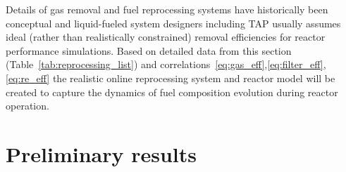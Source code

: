Details of gas removal and fuel reprocessing systems have historically been conceptual 
and liquid-fueled system designers including \gls{TAP} usually assumes ideal (rather 
than realistically constrained) removal efficiencies for reactor performance simulations.
Based on detailed data from this section (Table~\ref{tab:reprocessing_list}) and 
correlations~\ref{eq:gas_eff},\ref{eq:filter_eff},\ref{eq:re_eff} the realistic 
online reprocessing system and reactor model will be created to capture the dynamics 
of fuel composition evolution during reactor operation.



\section{Preliminary results}
